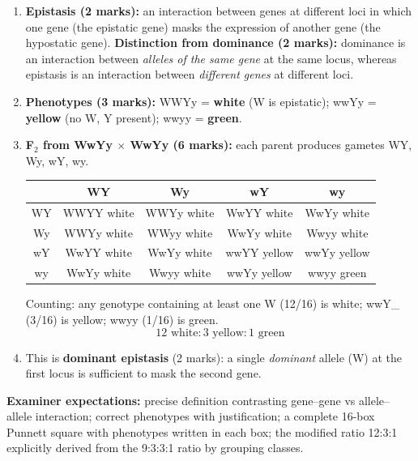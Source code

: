\documentclass[11pt]{article}
\begin{document}
\begin{corrige}
\begin{enumerate}
\item \textbf{Epistasis (2 marks):} an interaction between genes at different loci in which one gene (the epistatic gene) masks the expression of another gene (the hypostatic gene). \textbf{Distinction from dominance (2 marks):} dominance is an interaction between \emph{alleles of the same gene} at the same locus, whereas epistasis is an interaction between \emph{different genes} at different loci.
\item \textbf{Phenotypes (3 marks):} WWYy = \textbf{white} (W is epistatic); wwYy = \textbf{yellow} (no W, Y present); wwyy = \textbf{green}.
\item \textbf{F$_2$ from WwYy $\times$ WwYy (6 marks):} each parent produces gametes WY, Wy, wY, wy.

\begin{center}
\begin{tabular}{|c|c|c|c|c|}
\hline
\rowcolor{popblueL} & WY & Wy & wY & wy \\
\hline
WY & WWYY white & WWYy white & WwYY white & WwYy white \\
\hline
Wy & WWYy white & WWyy white & WwYy white & Wwyy white \\
\hline
wY & WwYY white & WwYy white & wwYY yellow & wwYy yellow \\
\hline
wy & WwYy white & Wwyy white & wwYy yellow & wwyy green \\
\hline
\end{tabular}
\end{center}

Counting: any genotype containing at least one W (12/16) is white; wwY\_ (3/16) is yellow; wwyy (1/16) is green.
\[ \boxed{12 \text{ white} : 3 \text{ yellow} : 1 \text{ green}} \]
\item This is \textbf{dominant epistasis} (2 marks): a single \emph{dominant} allele (W) at the first locus is sufficient to mask the second gene.
\end{enumerate}
\textbf{Examiner expectations:} precise definition contrasting gene--gene vs allele--allele interaction; correct phenotypes with justification; a complete 16-box Punnett square with phenotypes written in each box; the modified ratio 12:3:1 explicitly derived from the 9:3:3:1 ratio by grouping classes.
\end{corrige}
\end{document}

